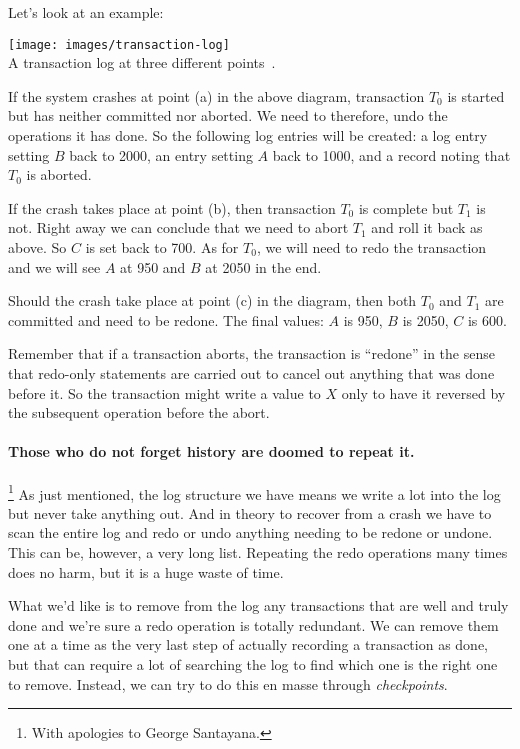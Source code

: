 \documentclass[a4paper]{report}
\begin{document}
Let's look at an example:

\begin{center}
	\texttt{[image: images/transaction-log]}\\
	A transaction log at three different points~\cite{dsc}.
\end{center}

If the system crashes at point (a) in the above diagram, transaction $T_{0}$ is started but has neither committed nor aborted. We need to therefore, undo the operations it has done. So the following log entries will be created: a log entry setting $B$ back to 2000, an entry setting $A$ back to 1000, and a record noting that $T_{0}$ is aborted.

If the crash takes place at point (b), then transaction $T_{0}$ is complete but $T_{1}$ is not. Right away we can conclude that we need to abort $T_{1}$ and roll it back as above. So $C$ is set back to 700. As for $T_{0}$, we will need to redo the transaction and we will see $A$ at 950 and $B$ at 2050 in the end.

Should the crash take place at point (c) in the diagram, then both $T_{0}$ and $T_{1}$ are committed and need to be redone. The final values: $A$ is 950, $B$ is 2050, $C$ is 600.

Remember that if a transaction aborts, the transaction is ``redone'' in the sense that redo-only statements are carried out to cancel out anything that was done before it. So the transaction might write a value to $X$ only to have it reversed by the subsequent operation before the abort.

\paragraph{Those who do not forget history are doomed to repeat it.}\footnote{With apologies to George Santayana.} As just mentioned, the log structure we have means we write a lot into the log but never take anything out. And in theory to recover from a crash we have to scan the entire log and redo or undo anything needing to be redone or undone. This can be, however, a very long list. Repeating the redo operations many times does no harm, but it is a huge waste of time.

What we'd like is to remove from the log any transactions that are well and truly done and we're sure a redo operation is totally redundant. We can remove them one at a time as the very last step of actually recording a transaction as done, but that can require a lot of searching the log to find which one is the right one to remove. Instead, we can try to do this en masse through \textit{checkpoints}.
\end{document}
